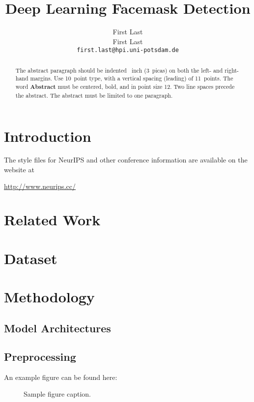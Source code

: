 \documentclass{article}
\title{Deep Learning Facemask Detection}
\author{
  First Last\\
  \And
  First Last\\
  \texttt{first.last@hpi.uni-potsdam.de} \\
}
\begin{document}
\maketitle


\begin{abstract}
  The abstract paragraph should be indented ~inch (3~picas) on
  both the left- and right-hand margins. Use 10~point type, with a vertical
  spacing (leading) of 11~points.  The word \textbf{Abstract} must be centered,
  bold, and in point size 12. Two line spaces precede the abstract. The abstract
  must be limited to one paragraph.
\end{abstract}

\newpage


\section{Introduction}
\label{intro}

The style files for NeurIPS and other conference information are available on
the website at
\begin{center}
  \url{http://www.neurips.cc/}
\end{center}


\section{Related Work}
\label{relwork}

\section{Dataset}
\label{dataset}


\section{Methodology}
\label{methods}

\subsection{Model Architectures}
\label{arch}

\subsection{Preprocessing}

An example figure can be found here:

\begin{figure}
  \centering
  \fbox{\rule[-.5cm]{0cm}{4cm} \rule[-.5cm]{4cm}{0cm}}
  \caption{Sample figure caption.}
\end{figure}
\end{document}

